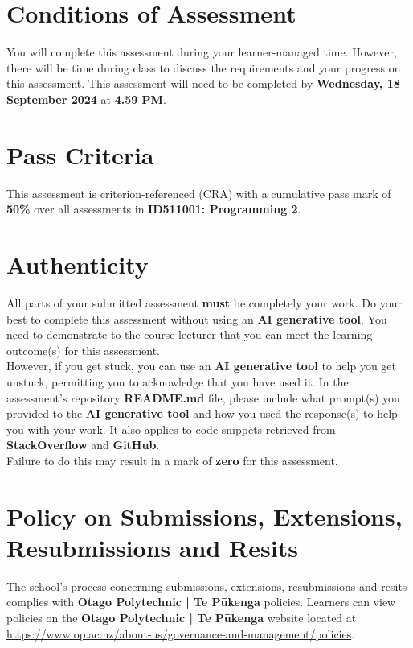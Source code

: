 \documentclass{article}
\begin{document}
\section*{Conditions of Assessment}
You will complete this assessment during your learner-managed time. However, there will be time during class to discuss the requirements and your progress on this assessment. This assessment will need to be completed by \textbf{Wednesday, 18 September 2024} at \textbf{4.59 PM}.

\section*{Pass Criteria}
This assessment is criterion-referenced (CRA) with a cumulative pass mark of \textbf{50\%} over all assessments in \textbf{ID511001: Programming 2}.

\section*{Authenticity}
All parts of your submitted assessment \textbf{must} be completely your work. Do your best to complete this assessment without using an \textbf{AI generative tool}. You need to demonstrate to the course lecturer that you can meet the learning outcome(s) for this assessment. \\
 
 However, if you get stuck, you can use an \textbf{AI generative tool} to help you get unstuck, permitting you to acknowledge that you have used it. In the assessment's repository \textbf{README.md} file, please include what prompt(s) you provided to the \textbf{AI generative tool} and how you used the response(s) to help you with your work. It also applies to code snippets retrieved from \textbf{StackOverflow} and \textbf{GitHub}. \\
 
 Failure to do this may result in a mark of \textbf{zero} for this assessment.

\section*{Policy on Submissions, Extensions, Resubmissions and Resits}
The school's process concerning submissions, extensions, resubmissions and resits complies with \textbf{Otago Polytechnic | Te Pūkenga} policies. Learners can view policies on the \textbf{Otago Polytechnic | Te Pūkenga} website located at \href{https://www.op.ac.nz/about-us/governance-and-management/policies}{https://www.op.ac.nz/about-us/governance-and-management/policies}.
\end{document}
